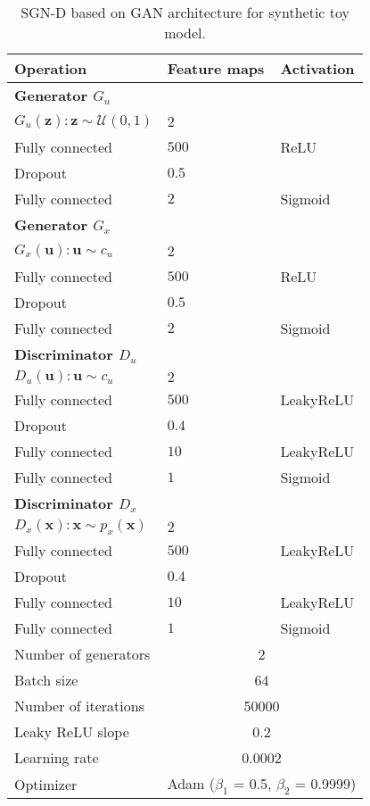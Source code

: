 \begin{table}
	\scriptsize %
	\centering
	\caption{SGN-D based on GAN architecture for synthetic toy model.}
	\begin{tabular}{ p{5cm}|p{2cm}|p{1.5cm}} 
		\toprule
		\textbf{Operation} & \textbf{Feature maps}  		& \textbf{Activation}  \\
		\midrule
		\textbf{Generator $G_u$} & &  \\ 
		$G_u(\mathbf{z}):\mathbf{z} \sim \mathcal{U}(0,1)$ & 2\\ 
		Fully connected & $500$ & ReLU \\
		Dropout & $0.5$ &  \\
		Fully connected & $2$ & Sigmoid \\  \hline
		\textbf{Generator $G_x$} &&   \\ 
		$G_x(\mathbf{u}):\mathbf{u} \sim c_u$ & 2\\ 
		Fully connected & $500$ & ReLU \\
		Dropout & $0.5$ &  \\
		Fully connected & $2$ & Sigmoid \\  \hline
		
		\textbf{Discriminator $D_u$} & &  \\ 
		$D_u(\mathbf{u}):\mathbf{u} \sim c_u$ & $2$\\ 
		Fully connected & $500$ & LeakyReLU \\ 
		Dropout & $0.4$ &  \\ 
		Fully connected & $10$ & LeakyReLU \\ 
		Fully connected & $1$ & Sigmoid \\  \hline
		\textbf{Discriminator $D_x$} & &  \\ 
		$D_x(\mathbf{x}):\mathbf{x} \sim p_x(\mathbf{x})$ & $2$ \\ 
		Fully connected & $500$ & LeakyReLU \\ 
		Dropout & $0.4$ &  \\ 
		Fully connected & $10$ & LeakyReLU \\ 
		Fully connected & $1$ & Sigmoid \\  \hline   \hline
		
		
		Number of generators & \multicolumn{2}{c}{2} \\
		Batch size & \multicolumn{2}{c}{64} \\
		Number of iterations & \multicolumn{2}{c}{50000} \\ 
		Leaky ReLU slope &  \multicolumn{2}{c}{0.2} \\ 
		Learning rate &  \multicolumn{2}{c}{0.0002}  \\ 
		Optimizer &  \multicolumn{2}{c}{Adam ($\beta_1$ = 0.5, $\beta_2$ = 0.9999)}  \\ \hline
	\end{tabular}
	
	\label{tab:combined_toy}
\end{table}

